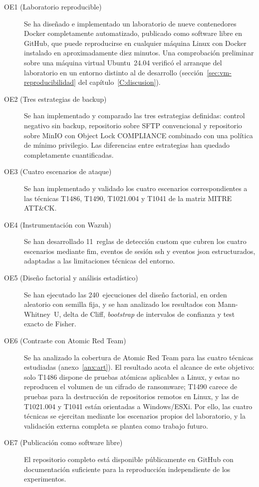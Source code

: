 \documentclass[../main.tex]{subfiles}
\begin{document}
\begin{description}
  \item[OE1 (Laboratorio reproducible)] Se ha diseñado e implementado un
  laboratorio de nueve contenedores Docker completamente automatizado, publicado
  como software libre en GitHub, que puede reproducirse en cualquier máquina Linux
  con Docker instalado en aproximadamente diez minutos. Una comprobación preliminar
  sobre una máquina virtual Ubuntu~24.04 verificó el arranque del laboratorio en un
  entorno distinto al de desarrollo (sección~\ref{sec:vm-reproducibilidad} del
  capítulo~\ref{C:discusion}).

  \item[OE2 (Tres estrategias de backup)] Se han implementado y comparado las
  tres estrategias definidas: control negativo sin backup, repositorio \restic
  sobre SFTP convencional y repositorio \restic sobre MinIO con Object Lock
  COMPLIANCE combinado con una política de mínimo privilegio. Las diferencias entre
  estrategias han quedado completamente cuantificadas.

  \item[OE3 (Cuatro escenarios de ataque)] Se han implementado y validado los
  cuatro escenarios correspondientes a las técnicas T1486, T1490, T1021.004 y
  T1041 de la matriz MITRE ATT\&CK.

  \item[OE4 (Instrumentación con Wazuh)] Se han desarrollado 11~reglas de
  detección custom que cubren los cuatro escenarios mediante \gls{fim}, eventos de
  sesión \gls{ssh} y eventos \gls{json} estructurados, adaptadas a las limitaciones
  técnicas del entorno.

  \item[OE5 (Diseño factorial y análisis estadístico)] Se han ejecutado las
  240~ejecuciones del diseño factorial, en orden aleatorio con semilla fija, y se
  han analizado los resultados con Mann-Whitney~U, delta de Cliff, \emph{bootstrap}
  de intervalos de confianza y test exacto de Fisher.

  \item[OE6 (Contraste con Atomic Red Team)] Se ha analizado la cobertura de
  Atomic Red Team para las cuatro técnicas estudiadas (anexo~\ref{anx:art}). El
  resultado acota el alcance de este objetivo: solo T1486 dispone de pruebas
  atómicas aplicables a Linux, y estas no reproducen el volumen de un cifrado de
  ransomware; T1490 carece de pruebas para la destrucción de repositorios remotos
  en Linux, y las de T1021.004 y T1041 están orientadas a Windows/ESXi. Por ello,
  las cuatro técnicas se ejercitan mediante los escenarios propios del
  laboratorio, y la validación externa completa se plantea como trabajo futuro.

  \item[OE7 (Publicación como software libre)] El repositorio completo está
  disponible públicamente en GitHub con documentación suficiente para la
  reproducción independiente de los experimentos.
\end{description}
\end{document}
